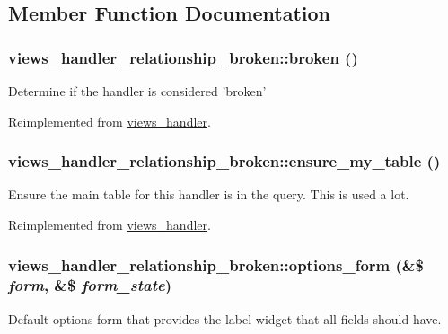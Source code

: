 \subsection{Member Function Documentation}
\hypertarget{classviews__handler__relationship__broken_ac4e5826e70953e7ec16f50ec264fdb53}{
\subsubsection[{broken}]{\setlength{\rightskip}{0pt plus 5cm}views\_\-handler\_\-relationship\_\-broken::broken ()}}
\label{classviews__handler__relationship__broken_ac4e5826e70953e7ec16f50ec264fdb53}
Determine if the handler is considered 'broken' 

Reimplemented from \hyperlink{classviews__handler_ac1cd2ff30cb558c79cc908be516fb725}{views\_\-handler}.\hypertarget{classviews__handler__relationship__broken_acea2731924b5f5e3b83776f237b3ff67}{
\subsubsection[{ensure\_\-my\_\-table}]{\setlength{\rightskip}{0pt plus 5cm}views\_\-handler\_\-relationship\_\-broken::ensure\_\-my\_\-table ()}}
\label{classviews__handler__relationship__broken_acea2731924b5f5e3b83776f237b3ff67}
Ensure the main table for this handler is in the query. This is used a lot. 

Reimplemented from \hyperlink{classviews__handler_a947f21ef0f21a77f4d103af4702b3600}{views\_\-handler}.\hypertarget{classviews__handler__relationship__broken_aa421a42866d049732e8747669466ae0e}{
\subsubsection[{options\_\-form}]{\setlength{\rightskip}{0pt plus 5cm}views\_\-handler\_\-relationship\_\-broken::options\_\-form (\&\$ {\em form}, \/  \&\$ {\em form\_\-state})}}
\label{classviews__handler__relationship__broken_aa421a42866d049732e8747669466ae0e}
Default options form that provides the label widget that all fields should have. 

